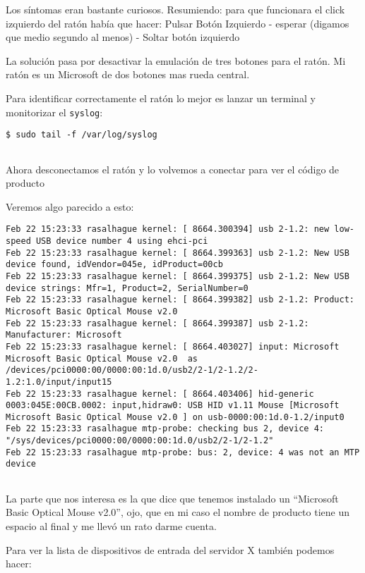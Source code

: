 Los síntomas eran bastante curiosos. Resumiendo: para que funcionara el
click izquierdo del ratón había que hacer: Pulsar Botón Izquierdo -
esperar (digamos que medio segundo al menos) - Soltar botón izquierdo

La solución pasa por desactivar la emulación de tres botones para el
ratón. Mi ratón es un Microsoft de dos botones mas rueda central.

Para identificar correctamente el ratón lo mejor es lanzar un terminal y
monitorizar el \texttt{syslog}:

\begin{verbatim}
$ sudo tail -f /var/log/syslog
      
\end{verbatim}

Ahora desconectamos el ratón y lo volvemos a conectar para ver el código
de producto

Veremos algo parecido a esto:

\begin{verbatim}
Feb 22 15:23:33 rasalhague kernel: [ 8664.300394] usb 2-1.2: new low-speed USB device number 4 using ehci-pci
Feb 22 15:23:33 rasalhague kernel: [ 8664.399363] usb 2-1.2: New USB device found, idVendor=045e, idProduct=00cb
Feb 22 15:23:33 rasalhague kernel: [ 8664.399375] usb 2-1.2: New USB device strings: Mfr=1, Product=2, SerialNumber=0
Feb 22 15:23:33 rasalhague kernel: [ 8664.399382] usb 2-1.2: Product: Microsoft Basic Optical Mouse v2.0
Feb 22 15:23:33 rasalhague kernel: [ 8664.399387] usb 2-1.2: Manufacturer: Microsoft
Feb 22 15:23:33 rasalhague kernel: [ 8664.403027] input: Microsoft  Microsoft Basic Optical Mouse v2.0  as /devices/pci0000:00/0000:00:1d.0/usb2/2-1/2-1.2/2-1.2:1.0/input/input15
Feb 22 15:23:33 rasalhague kernel: [ 8664.403406] hid-generic 0003:045E:00CB.0002: input,hidraw0: USB HID v1.11 Mouse [Microsoft  Microsoft Basic Optical Mouse v2.0 ] on usb-0000:00:1d.0-1.2/input0
Feb 22 15:23:33 rasalhague mtp-probe: checking bus 2, device 4: "/sys/devices/pci0000:00/0000:00:1d.0/usb2/2-1/2-1.2"
Feb 22 15:23:33 rasalhague mtp-probe: bus: 2, device: 4 was not an MTP device
      
\end{verbatim}

La parte que nos interesa es la que dice que tenemos instalado un
``Microsoft Basic Optical Mouse v2.0'', ojo, que en mi caso el nombre de
producto tiene un espacio al final y me llevó un rato darme cuenta.

Para ver la lista de dispositivos de entrada del servidor X también
podemos hacer:

